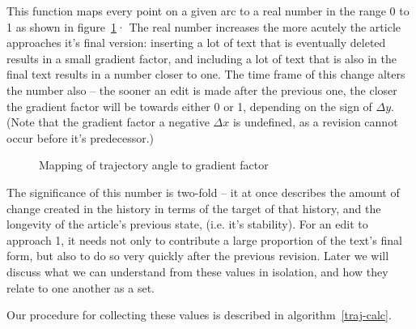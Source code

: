 This function maps every point on a given arc to a real number in the
range 0 to 1 as shown in figure~\ref{fig:circle-map}· The real number
increases the more acutely the article approaches it's final version:
inserting a lot of text that is eventually deleted results in a small
gradient factor, and including a lot of text that is also in the final
text results in a number closer to one. The time frame of this change
alters the number also -- the sooner an edit is made after the
previous one, the closer the gradient factor will be towards either 0
or 1, depending on the sign of $\Delta y$. (Note that the gradient
factor a negative $\Delta x$ is undefined, as a revision cannot occur
before it's predecessor.)

\begin{figure}
  \centering
  \caption{Mapping of trajectory angle to gradient factor}
  \label{fig:circle-map}
\end{figure}

The significance of this number is two-fold -- it at once describes
the amount of change created in the history in terms of the target of
that history, and the longevity of the article's previous state,
(i.e. it's stability). For an edit to approach 1, it needs not only to
contribute a large proportion of the text's final form, but also to do
so very quickly after the previous revision. Later we will discuss
what we can understand from these values in isolation, and how they
relate to one another as a set. 

Our procedure for collecting these values is described in
algorithm~\ref{traj-calc}.

